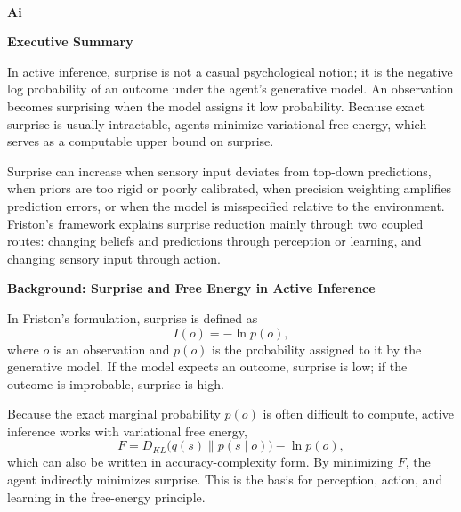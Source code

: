 \documentclass{book}
\providecommand{\ProjectDeepHeading}[2]{%
    \par\medskip\noindent\textbf{#2}\par\smallskip
}
\begin{document}

\

\ProjectDeepHeading{8}{Ai}


\ProjectDeepHeading{11}{Executive Summary}
        In active inference, surprise is not a casual psychological notion; it is the negative log probability of an outcome under the agent's generative model. An observation becomes surprising when the model assigns it low probability. Because exact surprise is usually intractable, agents minimize variational free energy, which serves as a computable upper bound on surprise.
        
        Surprise can increase when sensory input deviates from top-down predictions, when priors are too rigid or poorly calibrated, when precision weighting amplifies prediction errors, or when the model is misspecified relative to the environment. Friston's framework explains surprise reduction mainly through two coupled routes: changing beliefs and predictions through perception or learning, and changing sensory input through action.
    
    
    \ProjectDeepHeading{11}{Background: Surprise and Free Energy in Active Inference}
        In Friston's formulation, surprise is defined as
        \begin{equation}
            I(o) = -\ln p(o),
        \end{equation}
        where $o$ is an observation and $p(o)$ is the probability assigned to it by the generative model. If the model expects an outcome, surprise is low; if the outcome is improbable, surprise is high.
        
        Because the exact marginal probability $p(o)$ is often difficult to compute, active inference works with variational free energy,
        \begin{equation}
            F = D_{KL}\bigl(q(s) \parallel p(s \mid o)\bigr) - \ln p(o),
        \end{equation}
        which can also be written in accuracy-complexity form. By minimizing $F$, the agent indirectly minimizes surprise. This is the basis for perception, action, and learning in the free-energy principle.
    
\end{document}
